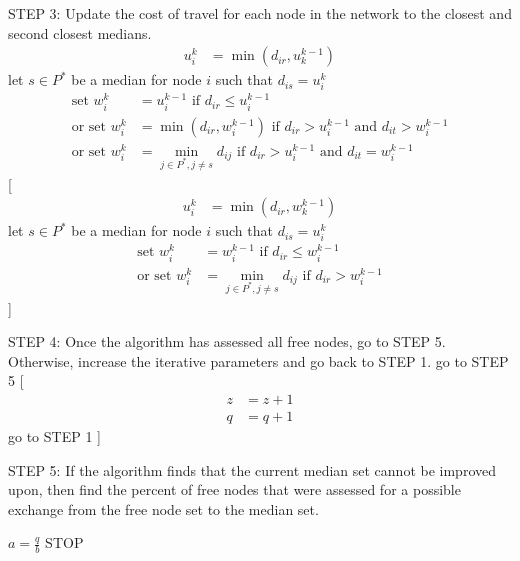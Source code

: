 \documentclass[11pt]{article}
\begin{document}
\begin{algorithm}
\begin{algorithmic}[0]
		\Statex
		\Statex STEP 3: Update the cost of travel for each node in the network to the closest and second closest medians.
		\begin{align*}
		u_i^k & = \min(d_{ir},u_k^{k-1})
		\end{align*}
		\Statex let $s \in P^*$ be a median for node $i$ such that $d_{is} = u_i^k$
		\begin{align*}
		\text{set } w_i^k & = u_i^{k-1} \text{ if } d_{ir} \leq u_i^{k-1}\\
		\text{or set } w_i^k & = \min(d_{ir},w_i^{k-1}) \text{ if } d_{ir} > u_i^{k-1} \text{ and } d_{it} > w_i^{k-1}\\
		\text{or set } w_i^k & = \min_{j\in P^*,j\neq s}d_{ij} \text{ if } d_{ir} > u_i^{k-1} \text{ and } d_{it} = w_i^{k-1}
		\end{align*}
		[
		\begin{align*}
		u_i^k & = \min(d_{ir},w_k^{k-1})
		\end{align*}
		\Statex let $s \in P^*$ be a median for node $i$ such that $d_{is} = u_i^k$
		\begin{align*}
		\text{set } w_i^k & = w_i^{k-1} \text{ if } d_{ir} \leq w_i^{k-1}\\
		\text{or set } w_i^k & = \min_{j\in P^*,j\neq s}d_{ij} \text{ if }d_{ir} > w_i^{k-1}
		\end{align*}
		]
		\EndIf
		
		
		\Statex
		\Statex STEP 4: Once the algorithm has assessed all free nodes, go to STEP 5. Otherwise, increase the iterative parameters and go back to STEP 1.
		\Statex go to STEP 5
		[
		\begin{align*}
		z&=z+1\\
		q&=q+1
		\end{align*}
		\Statex go to STEP 1
		]
		\EndIf
		
		
		\Statex
		\Statex STEP 5: If the algorithm finds that the current median set cannot be improved upon, then find the percent of free nodes that were assessed for a possible exchange from the free node set to the median set.
		\begin{center}
			$a=\frac{q}{b}$
			STOP
		\end{center}
	
	\end{algorithmic}
\end{algorithm}
\end{document}
